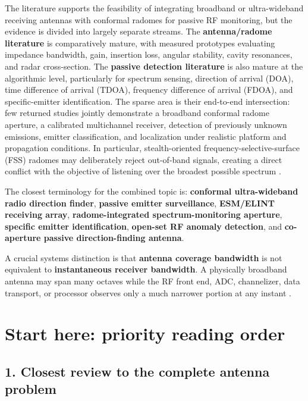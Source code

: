 \documentclass[
  10pt,
]{article}
\begin{document}
The literature supports the feasibility of integrating broadband or
ultra-wideband receiving antennas with conformal radomes for passive RF
monitoring, but the evidence is divided into largely separate streams.
The \textbf{antenna/radome literature} is comparatively mature, with
measured prototypes evaluating impedance bandwidth, gain, insertion
loss, angular stability, cavity resonances, and radar cross-section. The
\textbf{passive detection literature} is also mature at the algorithmic
level, particularly for spectrum sensing, direction of arrival (DOA),
time difference of arrival (TDOA), frequency difference of arrival
(FDOA), and specific-emitter identification. The sparse area is their
end-to-end intersection: few returned studies jointly demonstrate a
broadband conformal radome aperture, a calibrated multichannel receiver,
detection of previously unknown emissions, emitter classification, and
localization under realistic platform and propagation conditions. In
particular, stealth-oriented frequency-selective-surface (FSS) radomes
may deliberately reject out-of-band signals, creating a direct conflict
with the objective of listening over the broadest possible spectrum
\citep{costa2012, lv2021, sheng2024, xing2022}.

The closest terminology for the combined topic is: \textbf{conformal
ultra-wideband radio direction finder}, \textbf{passive emitter
surveillance}, \textbf{ESM/ELINT receiving array},
\textbf{radome-integrated spectrum-monitoring aperture},
\textbf{specific emitter identification}, \textbf{open-set RF anomaly
detection}, and \textbf{co-aperture passive direction-finding antenna}.

A crucial systems distinction is that \textbf{antenna coverage
bandwidth} is not equivalent to \textbf{instantaneous receiver
bandwidth}. A physically broadband antenna may span many octaves while
the RF front end, ADC, channelizer, data transport, or processor
observes only a much narrower portion at any instant
\citep{flak2022, madanayake2024, subbaraman2022}.

\section{Start here: priority reading
order}\label{start-here-priority-reading-order}

\subsection{1. Closest review to the complete antenna
problem}\label{closest-review-to-the-complete-antenna-problem}
\end{document}
